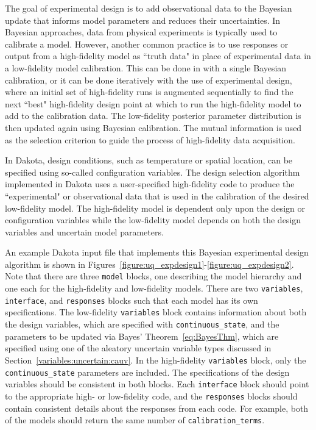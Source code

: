 The goal of experimental design is to add observational data to the Bayesian
update that informs model parameters and reduces their uncertainties. In 
Bayesian approaches, data from physical experiments is typically used to 
calibrate a model. However, another common practice is to use responses or
output from a high-fidelity model as ``truth data" in place of experimental 
data in a low-fidelity model calibration. This can be done in with a single
Bayesian calibration, or it can be done iteratively with the use of 
experimental design, where an initial set of high-fidelity runs is 
augmented sequentially to find the next ``best" high-fidelity design point at
which to run the high-fidelity model to add to the calibration data. The 
low-fidelity posterior parameter distribution is then updated again using 
Bayesian calibration. The mutual information is used as the selection criterion 
to guide the process of high-fidelity data acquisition.

In Dakota, design conditions, such as temperature or spatial location, can be 
specified using so-called configuration
variables. The design selection algorithm implemented in Dakota uses a 
user-specified high-fidelity code to produce the ``experimental" or 
observational data that is used in the calibration of the desired low-fidelity 
model. The high-fidelity model is dependent only upon the design or 
configuration variables while the low-fidelity model depends on both the 
design variables and uncertain model parameters. 

An example Dakota input file that implements this Bayesian experimental design 
algorithm is shown in 
Figures~\ref{figure:uq_expdesign1}-\ref{figure:uq_expdesign2}. Note that there 
are three \texttt{model} blocks, one describing the model hierarchy and one 
each for the high-fidelity and low-fidelity models. There are two 
\texttt{variables}, \texttt{interface}, and \texttt{responses} blocks such that 
each model has its own specifications. The low-fidelity \texttt{variables} 
block contains information about both the design variables, which are specified 
with \texttt{continuous\_state}, and the parameters to be updated via Bayes' 
Theorem~\ref{eq:BayesThm}, which are specified using one of the aleatory 
uncertain variable types discussed in Section~\ref{variables:uncertain:cauv}. 
In the high-fidelity \texttt{variables} block, only the 
\texttt{continuous\_state} parameters are included. The specifications of the 
design variables should be consistent in both blocks. Each \texttt{interface} 
block should point to the appropriate high- or low-fidelity code, and the 
\texttt{responses} blocks should contain consistent details about the responses 
from each code. For example, both of the models should return the same number 
of \texttt{calibration\_terms}.  

